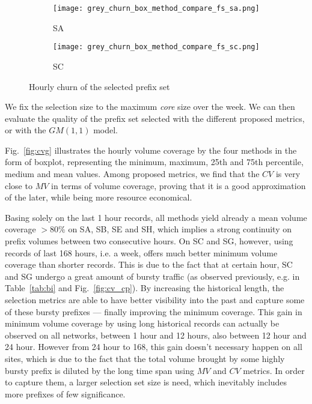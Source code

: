 \documentclass[10pt, conference,letterpaper]{IEEEtran}
\begin{document}
\begin{figure*}[!tb]
\centering
		\centering
        \begin{subfigure}[b]{0.49\textwidth}
        \centering
                \texttt{[image: grey\_churn\_box\_method\_compare\_fs\_sa.png]}
                \caption{SA}
                \label{fig:churn_sa}
        \end{subfigure}
        \hfill
        \begin{subfigure}[b]{0.49\textwidth}
        \centering
                \texttt{[image: grey\_churn\_box\_method\_compare\_fs\_sc.png]}
                \caption{SC}
                \label{fig:churn_sc}
        \end{subfigure}
\caption{Hourly churn of the selected prefix set}
\label{fig:churn}
\end{figure*}

We fix the selection size to the maximum \textit{core} size over the week. 
We can then evaluate the quality of the prefix set selected with the different proposed metrics, or with the $GM(1,1)$ model. 

Fig.~\ref{fig:cvg} illustrates the hourly volume coverage by the four methods in the form of boxplot, representing the minimum, maximum, 25th and 75th percentile, medium and mean values. 
Among proposed metrics, we find that the $CV$ is very close to $MV$ in terms of volume coverage, proving that it is a good approximation of the later, while being more resource economical.

Basing solely on the last 1 hour records, all methods yield already a mean volume coverage $>80\%$ on SA, SB, SE and SH, which implies a strong continuity on prefix volumes between two consecutive hours. 
On SC and SG, however, using records of last 168 hours, i.e. a week, offers much better minimum volume coverage than shorter records. This is due to the fact that at certain hour, SC and SG undergo a great amount of bursty traffic (as observed previously, e.g. in Table~\ref{tab:bi} and Fig.~\ref{fig:cv_cp}). By increasing the historical length, the selection metrics are able to have better visibility into the past and capture some of these bursty prefixes ---  finally improving the minimum coverage.
This gain in minimum volume coverage by using long historical records can actually be observed on all networks, between 1 hour and 12 hours, also between 12 hour and 24 hour. 
However from 24 hour to 168, this gain doesn't necessary happen on all sites, which is due to the fact that the total volume brought by some highly bursty prefix is diluted by the long time span using $MV$ and $CV$ metrics. In order to capture them, a larger selection set size is need, which inevitably includes more prefixes of few significance.
\end{document}
